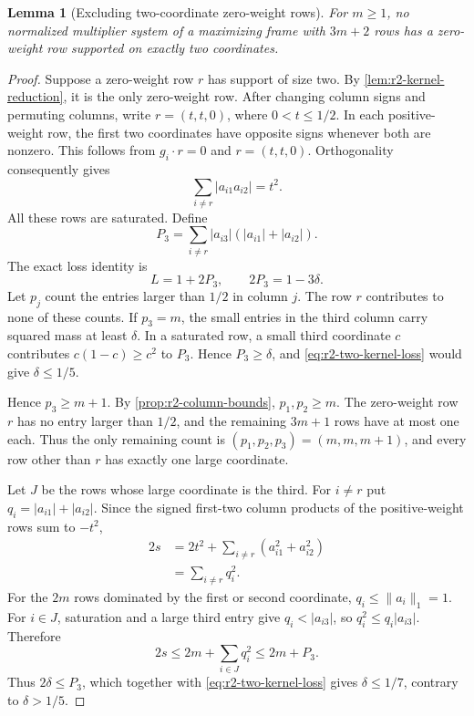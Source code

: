 \documentclass[11pt]{article}
\numberwithin{equation}{section}
\newtheorem{lemma}[lemma]{Lemma}
\theoremstyle{definition}
\theoremstyle{definition}
\begin{document}
\begin{lemma}[Excluding two-coordinate zero-weight rows]
\label{lem:r2-zero-weight-pair}
For $m\ge1$, no normalized multiplier system of a maximizing frame
with $3m+2$ rows has a zero-weight row supported on exactly two
coordinates.
\end{lemma}
\begin{proof}
Suppose a zero-weight row $r$ has support of size two.
By \cref{lem:r2-kernel-reduction}, it is the only zero-weight row.
After changing column signs and permuting columns, write
$r=(t,t,0)$, where $0<t\le1/2$.
In each positive-weight row, the first two coordinates have
opposite signs whenever both are nonzero. This follows from
$g_i\cdot r=0$ and $r=(t,t,0)$. Orthogonality consequently gives
\[
 \sum_{i\ne r}|a_{i1}a_{i2}|=t^2.
\]
All these rows are saturated. Define
\[
 P_3=\sum_{i\ne r}|a_{i3}|(|a_{i1}|+|a_{i2}|).
\]
The exact loss identity is
\begin{equation}
 L=1+2P_3,\qquad 2P_3=1-3\delta.
 \label{eq:r2-two-kernel-loss}
\end{equation}
Let $p_j$ count the entries larger than $1/2$ in column $j$.
The row $r$ contributes to none of these counts. If $p_3=m$,
the small entries in the third column carry squared mass at
least $\delta$. In a saturated row, a small third coordinate
$c$ contributes $c(1-c)\ge c^2$ to $P_3$.
Hence $P_3\ge\delta$, and \eqref{eq:r2-two-kernel-loss}
would give $\delta\le1/5$.

Hence $p_3\ge m+1$.  By \cref{prop:r2-column-bounds},
$p_1,p_2\ge m$.  The zero-weight row $r$ has no entry larger
than $1/2$, and the remaining $3m+1$ rows have at most one each.
Thus the only remaining count is
$(p_1,p_2,p_3)=(m,m,m+1)$, and every row other than $r$ has
exactly one large coordinate.

Let $J$ be the rows whose large coordinate is the third.
For $i\ne r$ put $q_i=|a_{i1}|+|a_{i2}|$.  Since the signed first-two
column products of the positive-weight rows sum to $-t^2$,
\[
 \begin{aligned}
 2s
 &=2t^2+\sum_{i\ne r}(a_{i1}^2+a_{i2}^2)\\
 &=\sum_{i\ne r}q_i^2.
 \end{aligned}
\]
For the $2m$ rows dominated by the first or second coordinate,
$q_i\le\|a_i\|_1=1$.  For $i\in J$, saturation and a large third
entry give $q_i<|a_{i3}|$, so $q_i^2\le q_i|a_{i3}|$.
Therefore
\[
 2s\le2m+\sum_{i\in J}q_i^2\le2m+P_3.
\]
Thus $2\delta\le P_3$, which together with
\eqref{eq:r2-two-kernel-loss} gives $\delta\le1/7$,
contrary to $\delta>1/5$.
\end{proof}
\end{document}
